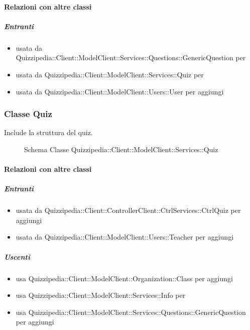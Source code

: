 \paragraph{Relazioni con altre classi}
\subparagraph{Entranti}
\begin{itemize}
\item usata da Quizzipedia::Client::ModelClient::Services::Questions::GenericQuestion per 
\item usata da Quizzipedia::Client::ModelClient::Services::Quiz per 
\item usata da Quizzipedia::Client::ModelClient::Users::User per aggiungi
\end{itemize}
\subsubsection{Classe Quiz}
Include la struttura del quiz.
\begin{figure}[H]
\centering
\noindent{}
\caption[Schema Classe Quiz]{Schema Classe Quizzipedia::Client::ModelClient::Services::Quiz}
\end{figure}
\paragraph{Relazioni con altre classi}
\subparagraph{Entranti}
\begin{itemize}
\item usata da Quizzipedia::Client::ControllerClient::CtrlServices::CtrlQuiz per aggiungi
\item usata da Quizzipedia::Client::ModelClient::Users::Teacher per aggiungi
\end{itemize}
\subparagraph{Uscenti}
\begin{itemize}
\item usa Quizzipedia::Client::ModelClient::Organization::Class per aggiungi
\item usa Quizzipedia::Client::ModelClient::Services::Info per 
\item usa Quizzipedia::Client::ModelClient::Services::Questions::GenericQuestion per aggiungi
\end{itemize}
